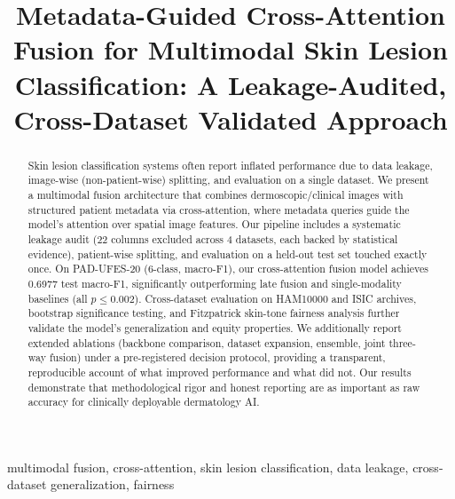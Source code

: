 \documentclass[conference]{IEEEtran}
\begin{document}
\title{Metadata-Guided Cross-Attention Fusion for Multimodal Skin Lesion Classification: A Leakage-Audited, Cross-Dataset Validated Approach}

\author{
}

\maketitle

\begin{abstract}
Skin lesion classification systems often report inflated performance due to data leakage, image-wise (non-patient-wise) splitting, and evaluation on a single dataset. We present a multimodal fusion architecture that combines dermoscopic/clinical images with structured patient metadata via cross-attention, where metadata queries guide the model's attention over spatial image features. Our pipeline includes a systematic leakage audit (22 columns excluded across 4 datasets, each backed by statistical evidence), patient-wise splitting, and evaluation on a held-out test set touched exactly once. On PAD-UFES-20 (6-class, macro-F1), our cross-attention fusion model achieves 0.6977 test macro-F1, significantly outperforming late fusion and single-modality baselines (all $p \leq 0.002$). Cross-dataset evaluation on HAM10000 and ISIC archives, bootstrap significance testing, and Fitzpatrick skin-tone fairness analysis further validate the model's generalization and equity properties. We additionally report extended ablations (backbone comparison, dataset expansion, ensemble, joint three-way fusion) under a pre-registered decision protocol, providing a transparent, reproducible account of what improved performance and what did not. Our results demonstrate that methodological rigor and honest reporting are as important as raw accuracy for clinically deployable dermatology AI.
\end{abstract}

\begin{IEEEkeywords}
multimodal fusion, cross-attention, skin lesion classification, data leakage, cross-dataset generalization, fairness
\end{IEEEkeywords}
\end{document}
